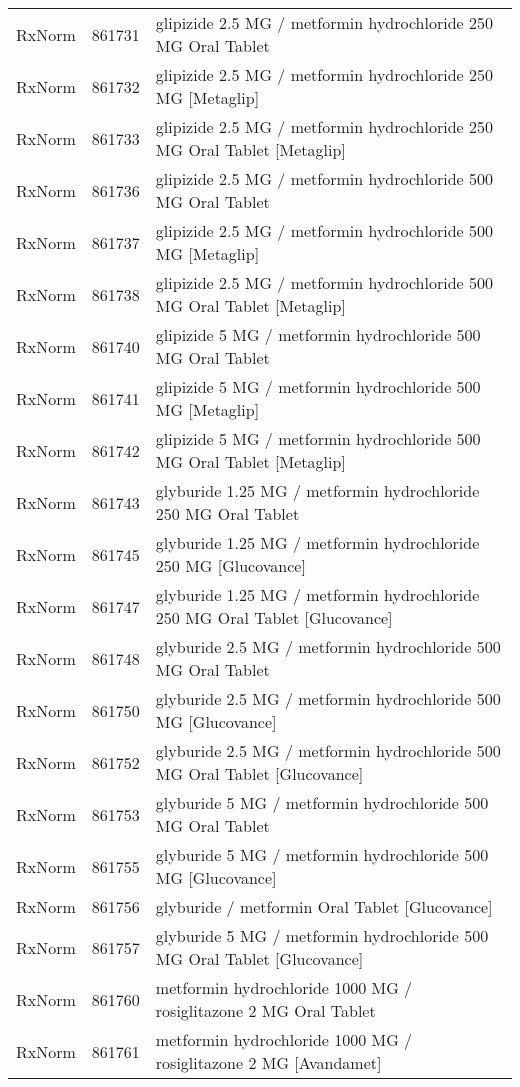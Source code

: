 \begin{longtable}{p{}p{}p{}}
  RxNorm & 861731 & glipizide 2.5 MG / metformin hydrochloride 250 MG Oral Tablet \\ 
  RxNorm & 861732 & glipizide 2.5 MG / metformin hydrochloride 250 MG [Metaglip] \\ 
  RxNorm & 861733 & glipizide 2.5 MG / metformin hydrochloride 250 MG Oral Tablet [Metaglip] \\ 
  RxNorm & 861736 & glipizide 2.5 MG / metformin hydrochloride 500 MG Oral Tablet \\ 
  RxNorm & 861737 & glipizide 2.5 MG / metformin hydrochloride 500 MG [Metaglip] \\ 
  RxNorm & 861738 & glipizide 2.5 MG / metformin hydrochloride 500 MG Oral Tablet [Metaglip] \\ 
  RxNorm & 861740 & glipizide 5 MG / metformin hydrochloride 500 MG Oral Tablet \\ 
  RxNorm & 861741 & glipizide 5 MG / metformin hydrochloride 500 MG [Metaglip] \\ 
  RxNorm & 861742 & glipizide 5 MG / metformin hydrochloride 500 MG Oral Tablet [Metaglip] \\ 
  RxNorm & 861743 & glyburide 1.25 MG / metformin hydrochloride 250 MG Oral Tablet \\ 
  RxNorm & 861745 & glyburide 1.25 MG / metformin hydrochloride 250 MG [Glucovance] \\ 
  RxNorm & 861747 & glyburide 1.25 MG / metformin hydrochloride 250 MG Oral Tablet [Glucovance] \\ 
  RxNorm & 861748 & glyburide 2.5 MG / metformin hydrochloride 500 MG Oral Tablet \\ 
  RxNorm & 861750 & glyburide 2.5 MG / metformin hydrochloride 500 MG [Glucovance] \\ 
  RxNorm & 861752 & glyburide 2.5 MG / metformin hydrochloride 500 MG Oral Tablet [Glucovance] \\ 
  RxNorm & 861753 & glyburide 5 MG / metformin hydrochloride 500 MG Oral Tablet \\ 
  RxNorm & 861755 & glyburide 5 MG / metformin hydrochloride 500 MG [Glucovance] \\ 
  RxNorm & 861756 & glyburide / metformin Oral Tablet [Glucovance] \\ 
  RxNorm & 861757 & glyburide 5 MG / metformin hydrochloride 500 MG Oral Tablet [Glucovance] \\ 
  RxNorm & 861760 & metformin hydrochloride 1000 MG / rosiglitazone 2 MG Oral Tablet \\ 
  RxNorm & 861761 & metformin hydrochloride 1000 MG / rosiglitazone 2 MG [Avandamet] \\ 

\end{longtable}
